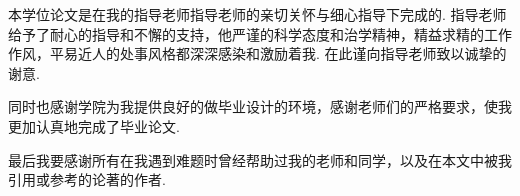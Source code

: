 ﻿\begin{gratitude}
本学位论文是在我的指导老师{指导老师}的亲切关怀与细心指导下完成的. {指导老师}给予了耐心的指导和不懈的支持，他严谨的科学态度和治学精神，精益求精的工作作风，平易近人的处事风格都深深感染和激励着我. 在此谨向{指导老师}致以诚挚的谢意.
\par
同时也感谢学院为我提供良好的做毕业设计的环境，感谢老师们的严格要求，使我更加认真地完成了毕业论文.
\par
最后我要感谢所有在我遇到难题时曾经帮助过我的老师和同学，以及在本文中被我引用或参考的论著的作者.
\end{gratitude}
